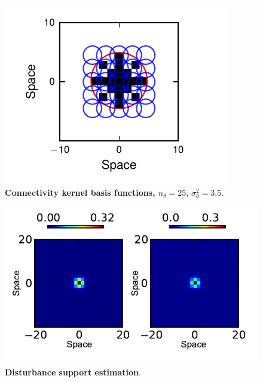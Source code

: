 \documentclass[]{article}
\begin{document}

\begin{figure}[!ht]
\begin{center}
\includegraphics{./Figures/KernelBasis1.pdf}
\end{center}
\caption{{\bf Connectivity kernel basis functions, $n_{\theta}=25$}, $\sigma^2_{\theta}=3.5$.}
\label{fig:KernelWidthEstimation}
\end{figure}
\begin{figure}[!ht]
\begin{center}
\includegraphics{./Figures/DisturbanceWidthEstimation.pdf}
\end{center}
\caption{{\bf Disturbance support estimation}.}
\label{fig:DisturbanceWidthEstimation}
\end{figure}
\end{document}
